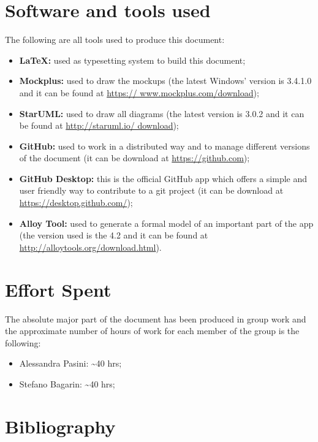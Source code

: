\section{Software and tools used}
The following are all tools used to produce this document:
\begin{itemize}
	\item \textbf{\LaTeX:} used as typesetting system to build this document;
	\item \textbf{Mockplus:} used to draw the mockups (the latest Windows' version is 3.4.1.0 and it can be found at \url{https://			www.mockplus.com/download});
	\item \textbf{StarUML:} used to draw all diagrams (the latest version is 3.0.2 and it can be found at \url{http://staruml.io/			download});
	\item \textbf{GitHub:} used to work in a distributed way and to manage different versions of the document (it can be download at		\url{https://github.com});
	\item \textbf{GitHub Desktop:} this is the official GitHub app which offers a simple and user friendly way to contribute to a git 			project (it can be download at \url{https://desktop.github.com/});
	\item \textbf{Alloy Tool:} used to generate a formal model of an important part of the app (the version used is the 4.2 and it 		can be found at \url{http://alloytools.org/download.html}).
\end{itemize}

\section{Effort Spent}
The absolute major part of the document has been produced in group work and the approximate number of hours of work for each member of the group is the following:
\begin{itemize}
\item Alessandra Pasini: \textasciitilde 40 hrs;
\item Stefano Bagarin: \textasciitilde 40 hrs;
\end{itemize}

\section{Bibliography}

